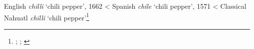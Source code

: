 \begin{etymology}\label{ety:chili}
English \textit{chilli} `chili pepper', 1662
< Spanish \textit{chile} `chili pepper', 1571
< Classical Nahuatl \textit{chīlli} `chili pepper'\footnote{\textcite[s.v. chilli]{oed}; \textcite[s.v. chile]{dle}; \textcite[s.v. chilli]{ond}}
\end{etymology}